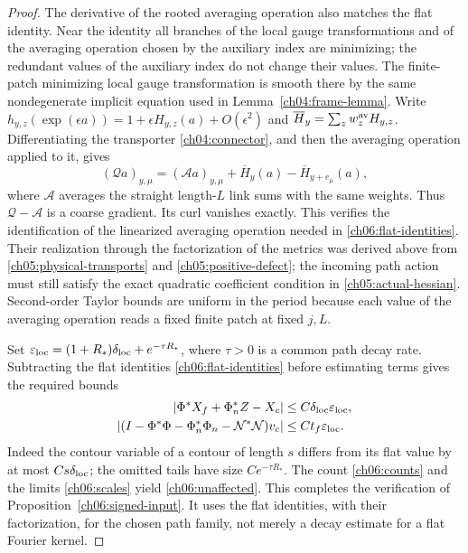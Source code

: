 \begin{proof}
The derivative of the rooted averaging operation also matches the flat
identity. Near the identity all branches of the local gauge transformations and of the averaging operation chosen by the auxiliary index
are minimizing; the redundant values of the auxiliary index do not change their values. The
finite-patch minimizing local gauge transformation is smooth there by the same nondegenerate
implicit equation used in Lemma~\ref{ch04:frame-lemma}. Write
$h_{y,z}(\exp(\epsilon a))=1+\epsilon H_{y,z}(a)+O(\epsilon^2)$ and
$\overline H_y=\sum_z w_z^{\rm av}H_{y,z}$. Differentiating
the transporter \eqref{ch04:connector}, and then the averaging operation applied to it, gives
\[
 (\mathcal Qa)_{y,\mu}
    =(\mathcal Aa)_{y,\mu}+\overline H_y(a)
                                -\overline H_{y+e_\mu}(a),
\]
where $\mathcal A$ averages the straight length-$L$ link sums with the
same weights. Thus $\mathcal Q-\mathcal A$ is a coarse gradient. Its curl
vanishes exactly. This verifies the identification of the linearized averaging operation needed in
\eqref{ch06:flat-identities}. Their realization through the factorization of the metrics was derived
above from \eqref{ch05:physical-transports} and
\eqref{ch05:positive-defect}; the incoming path action must still satisfy
the exact quadratic coefficient condition in
\eqref{ch05:actual-hessian}. Second-order
Taylor bounds are uniform in the period because each value of the averaging operation reads a
fixed finite patch at fixed $j,L$.

Set
$\varepsilon_{\rm loc}=(1+R_*)\delta_{\rm loc}+e^{-\tau R_*}$,
where $\tau>0$ is a common path decay rate. Subtracting the flat identities
\eqref{ch06:flat-identities} before estimating terms gives the required
bounds
\begin{align*}
 |\Phi^*X_f+\Phi_n^*Z-X_c|&\le C\delta_{\rm loc}\varepsilon_{\rm loc},\\
 |(I-\Phi^*\Phi-\Phi_n^*\Phi_n-\mathcal N^*\mathcal N)v_c|
                                    &\le Ct_f\varepsilon_{\rm loc}.
\end{align*}
Indeed the contour variable of a contour of length $s$ differs from its flat value by at most
$Cs\delta_{\rm loc}$; the omitted tails have size $Ce^{-\tau R_*}$.
The count \eqref{ch06:counts} and the limits \eqref{ch06:scales} yield
\eqref{ch06:unaffected}. This completes the verification of Proposition~\ref{ch06:signed-input}.
It uses the flat identities, with their factorization, for the chosen path family, not merely
a decay estimate for a flat Fourier kernel.
\end{proof}

